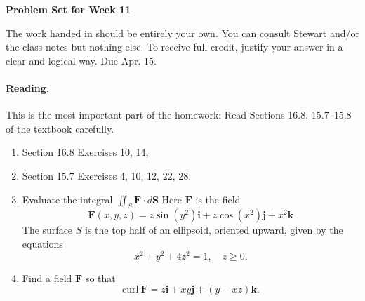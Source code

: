 \documentclass[11pt]{article}
\theoremstyle{plain}
\theoremstyle{definition}
\def\i{\mathbf i}
\def\j{\mathbf j}
\def\k{\mathbf k}
\def\F{\mathbf F}
\def\S{\mathbf S}
\begin{document}
\begin{center}
{\Large \bf Problem Set for Week 11}
\end{center}
The work handed in should be entirely your own. You can consult Stewart and/or the class notes but nothing else. To receive full credit, justify your answer in a clear and logical way. Due Apr. 15.

\paragraph{Reading.} This is the most important part of the homework: Read Sections 16.8, 15.7--15.8 of the textbook carefully. 

\begin{enumerate}
\item Section 16.8 Exercises 10, 14,
\item Section 15.7 Exercises 4, 10, 12, 22, 28.
\item Evaluate the integral
$\iint_S \F \cdot d\S$
Here $\F$ is the field
\[
\F(x,y,z) = z \sin(y^2)\i + z \cos(x^2)\j + x^2\k
\]
The surface $S$ is the top half of an ellipsoid, oriented upward, given by the equations
\[
x^2 + y^2 + 4z^2 = 1,\quad z \geq 0.
\]
\item Find a field $\F$ so that
\[
\mathrm{curl}~\F = z \i + xy \j + (y - xz)\k.
\]
\end{enumerate}
\end{document}
